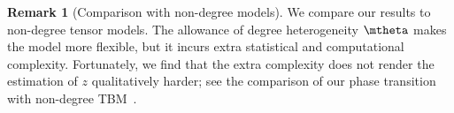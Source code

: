 \documentclass[lettersize,onecolumn,journal]{IEEEtran}
\theoremstyle{definition}
\theoremstyle{definition}
\newtheorem{rmk}{Remark}
\providecommand{\DIFdelbegin}{} %
\providecommand{\DIFdelend}{} %
\newcommand{\DIFscaledelfig}{0.5}
\newlength{\DIFdelgraphicswidth} %
\newlength{\DIFdelgraphicsheight} %
\newcommand{\DIFdelincludegraphics}[2][]{%
\sbox{\DIFdelgraphicsbox}{\DIFOincludegraphics[#1]{#2}}%
\settoboxwidth{\DIFdelgraphicswidth}{\DIFdelgraphicsbox} %
\settoboxtotalheight{\DIFdelgraphicsheight}{\DIFdelgraphicsbox} %
\scalebox{\DIFscaledelfig}{%
\parbox[b]{\DIFdelgraphicswidth}{\usebox{\DIFdelgraphicsbox}\\[-\baselineskip] \rule{\DIFdelgraphicswidth}{0em}}\llap{\resizebox{\DIFdelgraphicswidth}{\DIFdelgraphicsheight}{%
\setlength{\unitlength}{\DIFdelgraphicswidth}%
\begin{picture}(1,1)%
\thicklines\linethickness{2pt} %
{\color[rgb]{1,0,0}\put(0,0){\framebox(1,1){}}}%
{\color[rgb]{1,0,0}\put(0,0){\line( 1,1){1}}}%
{\color[rgb]{1,0,0}\put(0,1){\line(1,-1){1}}}%
\end{picture}%
}\hspace*{3pt}}} %
} %
\DeclareRobustCommand{\DIFdelbegin}{\DIFOdelbegin \let\includegraphics\DIFdelincludegraphics} %
\DeclareRobustCommand{\DIFdelend}{\DIFOaddend \let\includegraphics\DIFOincludegraphics} %
\begin{document}
\DIFdelend \begin{rmk}[Comparison with non-degree models]
We compare our results to non-degree tensor models. %
The allowance of degree heterogeneity $\mtheta$ makes the model more flexible, but it incurs extra statistical and computational complexity. Fortunately, we find that the extra complexity does not render the estimation of $z$ qualitatively harder; see the comparison of our phase transition with non-degree TBM~\citep{han2020exact}. 
\end{rmk}



\DIFdelbegin %


\end{document}
